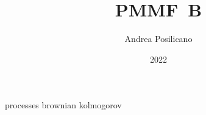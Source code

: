 \usepackage	{style}

\title	{PMMF~B}
\author	{Andrea Posilicano}
\date	{2022}


\maketitle
	{processes}
	{brownian}
\appendix
	{kolmogorov}

